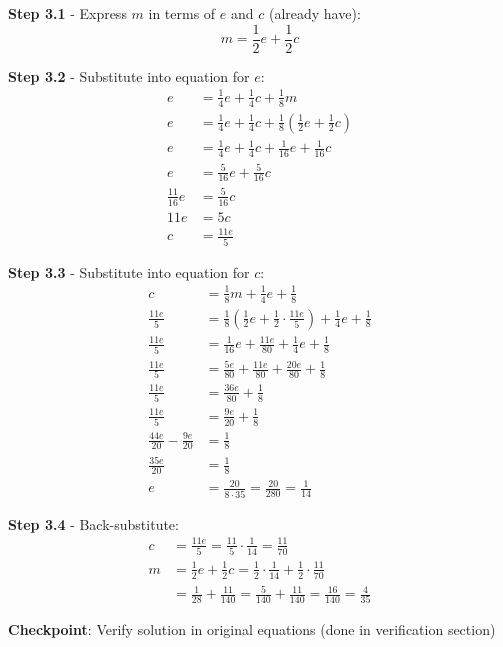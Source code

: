 \documentclass[12pt]{article}
\begin{document}
\begin{roadmapbox}
\textbf{Step 3.1} - Express $m$ in terms of $e$ and $c$ (already have):
\[m = \frac{1}{2}e + \frac{1}{2}c\]

\textbf{Step 3.2} - Substitute into equation for $e$:
\begin{align*}
e &= \frac{1}{4}e + \frac{1}{4}c + \frac{1}{8}m \\
e &= \frac{1}{4}e + \frac{1}{4}c + \frac{1}{8}\left(\frac{1}{2}e + \frac{1}{2}c\right) \\
e &= \frac{1}{4}e + \frac{1}{4}c + \frac{1}{16}e + \frac{1}{16}c \\
e &= \frac{5}{16}e + \frac{5}{16}c \\
\frac{11}{16}e &= \frac{5}{16}c \\
11e &= 5c \\
c &= \frac{11e}{5}
\end{align*}

\textbf{Step 3.3} - Substitute into equation for $c$:
\begin{align*}
c &= \frac{1}{8}m + \frac{1}{4}e + \frac{1}{8} \\
\frac{11e}{5} &= \frac{1}{8}\left(\frac{1}{2}e + \frac{1}{2} \cdot \frac{11e}{5}\right) + \frac{1}{4}e + \frac{1}{8} \\
\frac{11e}{5} &= \frac{1}{16}e + \frac{11e}{80} + \frac{1}{4}e + \frac{1}{8} \\
\frac{11e}{5} &= \frac{5e}{80} + \frac{11e}{80} + \frac{20e}{80} + \frac{1}{8} \\
\frac{11e}{5} &= \frac{36e}{80} + \frac{1}{8} \\
\frac{11e}{5} &= \frac{9e}{20} + \frac{1}{8} \\
\frac{44e}{20} - \frac{9e}{20} &= \frac{1}{8} \\
\frac{35e}{20} &= \frac{1}{8} \\
e &= \frac{20}{8 \cdot 35} = \frac{20}{280} = \frac{1}{14}
\end{align*}

\textbf{Step 3.4} - Back-substitute:
\begin{align*}
c &= \frac{11e}{5} = \frac{11}{5} \cdot \frac{1}{14} = \frac{11}{70} \\
m &= \frac{1}{2}e + \frac{1}{2}c = \frac{1}{2} \cdot \frac{1}{14} + \frac{1}{2} \cdot \frac{11}{70} \\
&= \frac{1}{28} + \frac{11}{140} = \frac{5}{140} + \frac{11}{140} = \frac{16}{140} = \frac{4}{35}
\end{align*}

\textbf{Checkpoint}: Verify solution in original equations (done in verification section)


\end{roadmapbox}
\end{document}
